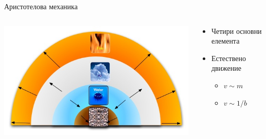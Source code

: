 \documentclass[10pt,a4paper]{beamer}
\begin{document}
        \begin{frame}{ Аристотелова механика }
			\begin{columns}
				\begin{column}{0.6\textwidth}
					\includegraphics[width=\textwidth]{images/aristotle_four_elements_motion.jpg}
				\end{column}
				\begin{column}{0.4\textwidth}
					\begin{itemize}
						\item Четири основни елемента
                        \item Естествено движение \begin{itemize}
                            \item $ v \sim m $
                            \item $ v \sim 1/b $
                        \end{itemize}
					\end{itemize}
				\end{column}
			\end{columns}
        \end{frame}
    
\end{document}
